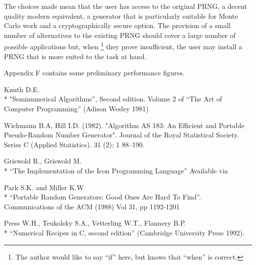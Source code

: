 \documentclass[letterpaper,12pt]{article}
\begin{document}
The choices made mean that the user has access to the original PRNG, a
decent quality modern equivalent, a generator that is particularly suitable
for Monte Carlo work and a cryptographically secure option.  The provision
of a small number of alternatives to the existing PRNG should cover a large
number of possible applications but, when%
\footnote{
  The author would like to say ``if'' here, but knows that ``when'' is
  correct.
  }
they prove insufficient, the user may install a PRNG that is more suited
to the task at hand.

Appendix F contains some preliminary performance figures.

\begin{thebibliography}{99}

\begin{samepage}
  Knuth D.E.\\*
  "Seminumerical Algorithms'', Second edition. Volume 2 of ``The Art of Computer
  Programming''
  (Adison Wesley 1981)
\end{samepage}

  Wichmann B.A, Hill I.D. (1982). "Algorithm AS 183: An Efficient and
  Portable Pseudo-Random Number Generator".
  Journal of the Royal Statistical Society. Series C (Applied Statistics). 31 (2): 1  88–190.

\begin{samepage}
  Griswold R., Griswold M.\\*
  ``The Implementation of the Icon Programming Language''
  Available via 
\end{samepage}

\begin{samepage}
  Park S.K. and Miller K.W\\*
  ``Portable Random Generators: Good Ones Are Hard To Find''.
  Communications of the ACM  (1988) Vol 31, pp 1192-1201
\end{samepage}

\begin{samepage}
  Press W.H., Teukolsky S.A., Vetterling W.T., Flannery B.P.\\*
  ``Numerical Recipes in C, second edition'' (Cambridge University Press 1992).
\end{samepage}


\end{thebibliography}
\end{document}
